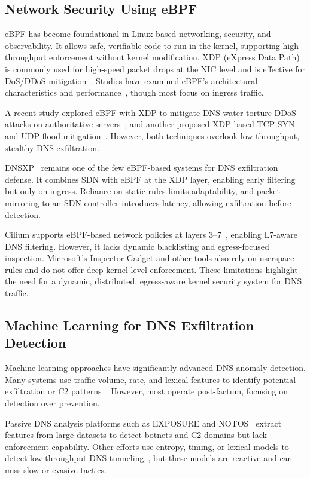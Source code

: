 \documentclass[letterpaper,twocolumn,10pt]{article}
\begin{document}
\subsection{Network Security Using eBPF}
eBPF has become foundational in Linux-based networking, security, and observability. It allows safe, verifiable code to run in the kernel, supporting high-throughput enforcement without kernel modification. XDP (eXpress Data Path) is commonly used for high-speed packet drops at the NIC level and is effective for DoS/DDoS mitigation~\cite{10.1145/3281411.3281443, 8850758}. Studies have examined eBPF's architectural characteristics and performance~\cite{10.1145/3371038, bertrone2018accelerating}, though most focus on ingress traffic.

A recent study explored eBPF with XDP to mitigate DNS water torture DDoS attacks on authoritative servers~\cite{9165454}, and another proposed XDP-based TCP SYN and UDP flood mitigation~\cite{bertin2017xdp}. However, both techniques overlook low-throughput, stealthy DNS exfiltration.

DNSXP~\cite{8725640, steadman2021dnsxp} remains one of the few eBPF-based systems for DNS exfiltration defense. It combines SDN with eBPF at the XDP layer, enabling early filtering but only on ingress. Reliance on static rules limits adaptability, and packet mirroring to an SDN controller introduces latency, allowing exfiltration before detection.

Cilium supports eBPF-based network policies at layers 3–7~\cite{zavarella2022methodology, 10.1145/3651890.3672227}, enabling L7-aware DNS filtering. However, it lacks dynamic blacklisting and egress-focused inspection. Microsoft’s Inspector Gadget and other tools also rely on userspace rules and do not offer deep kernel-level enforcement. These limitations highlight the need for a dynamic, distributed, egress-aware kernel security system for DNS traffic.

\subsection{Machine Learning for DNS Exfiltration Detection}
Machine learning approaches have significantly advanced DNS anomaly detection. Many systems use traffic volume, rate, and lexical features to identify potential exfiltration or C2 patterns~\cite{apt-process, Das, 8717806d}. However, most operate post-factum, focusing on detection over prevention.

Passive DNS analysis platforms such as EXPOSURE and NOTOS~\cite{bilge2011exposure, antonakakis2010building} extract features from large datasets to detect botnets and C2 domains but lack enforcement capability. Other efforts use entropy, timing, or lexical models to detect low-throughput DNS tunneling~\cite{DBLP:journals/corr/abs-1709-08395, 10.1145/3230833.3233278}, but these models are reactive and can miss slow or evasive tactics.
\end{document}
